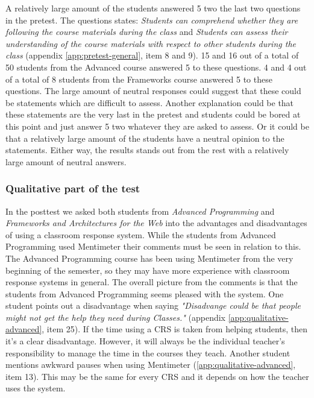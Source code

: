  
 

A relatively large amount of the students answered 5 two the last two questions in the pretest. The questions states: \emph{Students can comprehend whether they are following the course materials during the class} and \emph{Students can assess their understanding of the course materials with respect to other students during the class} (appendix \ref{app:pretest-general}, item 8 and 9). 15 and 16 out of a total of 50 students from the Advanced course answered 5 to these questions. 4 and 4 out of a total of 8 students from the Frameworks course answered 5 to these questions. The large amount of neutral responses could suggest that these could be statements which are difficult to assess. Another explanation could be that these statements are the very last in the pretest and students could be bored at this point and just answer 5 two whatever they are asked to assess. Or it could be that a relatively large amount of the students have a neutral opinion to the statements. Either way, the results stands out from the rest with a relatively large amount of neutral answers.














\subsubsection*{Qualitative part of the test}


In the posttest we asked both students from \emph{Advanced Programming} and \emph{Frameworks and Architectures for the Web} into the advantages and disadvantages of using a classroom response system. While the students from Advanced Programming used Mentimeter their comments must be seen in relation to this. The Advanced Programming course has been using Mentimeter from the very beginning of the semester, so they may have more experience with classroom response systems in general. The overall picture from the comments is that the students from Advanced Programming seems pleased with the system. One student points out a disadvantage when saying \emph{"Disadvange could be that people might not get the help they need during Classes."} (appendix \ref{app:qualitative-advanced}, item 25). If the time using a CRS is taken from helping students, then it's a clear disadvantage. However, it will always be the individual teacher's responsibility to manage the time in the courses they teach. Another student mentions awkward pauses when using Mentimeter (\ref{app:qualitative-advanced}, item 13). This may be the same for every CRS and it depends on how the teacher uses the system.

